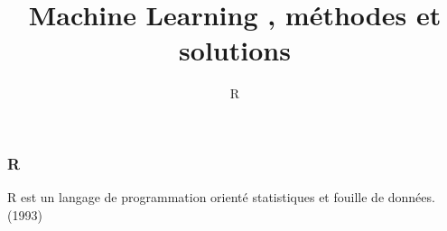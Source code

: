 \documentclass{formation}
\title{Machine Learning , méthodes et solutions}
\subtitle{R}
\begin{document}
\maketitle

\begin{frame}
  \frametitle{R}
  R est un langage de programmation orienté statistiques et fouille de données. \\
  (1993)
\end{frame}
\end{document}
